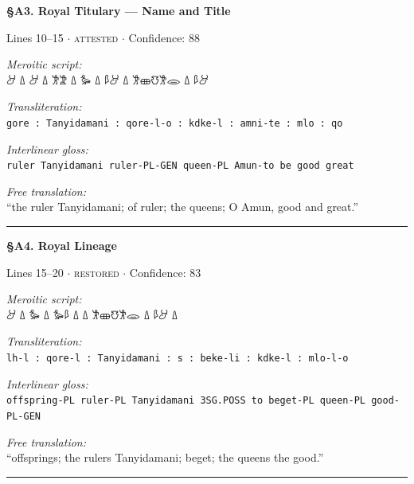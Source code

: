 \documentclass[11pt,a4paper]{article}
\begin{document}
{{\vspace{6pt}
\noindent\textbf{\S A3. Royal Titulary — Name and Title}
\hfill {\small Lines 10–15 $\cdot$ \textsc{attested} $\cdot$ Confidence: 88%

\vspace{3pt}
\noindent\textit{Meroitic script:}\\[2pt]
{\meroitic 𐦃𐦁 𐦗 𐦑𐦂𐦒𐦈𐦂 𐦗 𐦃𐦁 𐦗 𐦖 𐦗 𐦀𐦂 𐦗 𐦃 𐦗 𐦃}

\vspace{4pt}
\noindent\textit{Transliteration:}\\[2pt]
\texttt{gore : Tanyidamani : qore-l-o : kdke-l : amni-te : mlo : qo}

\vspace{4pt}
\noindent\textit{Interlinear gloss:}\\[2pt]
{\small\texttt{ruler  Tanyidamani  ruler-PL-GEN  queen-PL  Amun-to be  good  great}}

\vspace{4pt}
\noindent\textit{Free translation:}\\[2pt]
``the ruler Tanyidamani; of ruler; the queens; O Amun, good and great.''

\vspace{2pt}
\noindent\rule{\textwidth}{0.3pt}


\vspace{6pt}
\noindent\textbf{\S A4. Royal Lineage}
\hfill {\small Lines 15–20 $\cdot$ \textsc{restored} $\cdot$ Confidence: 83%

\vspace{3pt}
\noindent\textit{Meroitic script:}\\[2pt]
{\meroitic  𐦗 𐦃𐦁 𐦗 𐦑𐦂𐦒𐦈𐦂 𐦗  𐦗 𐦁𐦖 𐦗 𐦖 𐦗 𐦃}

\vspace{4pt}
\noindent\textit{Transliteration:}\\[2pt]
\texttt{lh-l : qore-l : Tanyidamani : s : beke-li : kdke-l : mlo-l-o}

\vspace{4pt}
\noindent\textit{Interlinear gloss:}\\[2pt]
{\small\texttt{offspring-PL  ruler-PL  Tanyidamani  3SG.POSS  to beget-PL  queen-PL  good-PL-GEN}}

\vspace{4pt}
\noindent\textit{Free translation:}\\[2pt]
``offsprings; the rulers Tanyidamani; beget; the queens the good.''

\vspace{2pt}
\noindent\rule{\textwidth}{0.3pt}


}}}}
\end{document}
